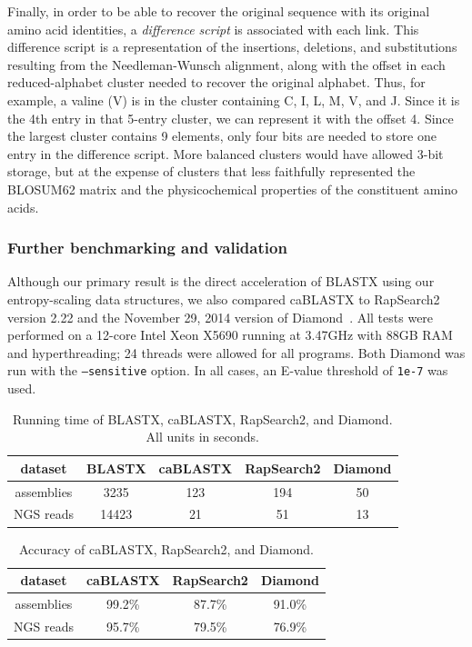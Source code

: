\documentclass[review,preprint,12pt]{elsarticle}
\renewcommand{\cite}{\citep} %
\theoremstyle{definition}
\theoremstyle{remark}
\begin{document}
Finally, in order to be able to recover the original sequence with its original
amino acid identities, a \textit{difference script} is associated with each
link.
This difference script is a representation of the insertions, deletions, and
substitutions resulting from the Needleman-Wunsch alignment, along with the
offset in each reduced-alphabet cluster needed to recover the original alphabet.
Thus, for example, a valine (V) is in the cluster containing C, I, L, M, V, and 
J.
Since it is the 4th entry in that 5-entry cluster, we can represent it with
the offset 4.
Since the largest cluster contains 9 elements, only four bits are needed to
store one entry in the difference script.
More balanced clusters would have allowed 3-bit storage, but at the expense of
clusters that less faithfully represented the BLOSUM62 matrix and the
physicochemical properties of the constituent amino acids.

\subsubsection{Further benchmarking and validation}

Although our primary result is the direct acceleration of BLASTX using our
entropy-scaling data structures, we also compared caBLASTX to 
RapSearch2~\cite{zhao2012rapsearch2} version 2.22 and the November 29, 2014 
version of Diamond~\cite{buchfink2014fast}.
All tests were performed on a 12-core Intel Xeon X5690 running at 3.47GHz with
88GB RAM and hyperthreading; 24 threads were allowed for all programs.
Both Diamond was run with the \texttt{--sensitive} option.
In all cases, an E-value threshold of \texttt{1e-7} was used.

\begin{table}
\caption{Running time of BLASTX, caBLASTX, RapSearch2, and Diamond. All units in seconds.\label{mgspeed}}
\begin{tabular}{ccccc}
\hline
dataset & BLASTX & caBLASTX & RapSearch2 & Diamond \\
\hline
assemblies & 3235 & 123 & 194 & 50 \\
\hline
NGS reads & 14423 & 21 & 51 & 13 \\
\hline
\end{tabular}
\end{table}

\begin{table}
\caption{Accuracy of caBLASTX, RapSearch2, and Diamond.\label{mgacc}}
\begin{tabular}{cccc}
\hline
dataset & caBLASTX & RapSearch2 & Diamond \\
\hline
assemblies & 99.2\% & 87.7\% & 91.0\% \\
\hline
NGS reads & 95.7\% & 79.5\% & 76.9\% \\
\hline
\end{tabular}
\end{table}
\end{document}
